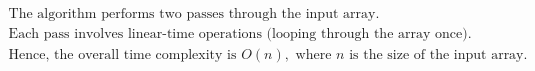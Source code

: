 \documentclass[preview]{standalone}
\begin{document}
\begin{align*}
\text{The algorithm performs two passes through the input array.} \\ \text{Each pass involves linear-time operations (looping through the array once).} \\ \text{Hence, the overall time complexity is } O(n), \text{ where } n \text{ is the size of the input array.}
\end{align*}
\end{document}

